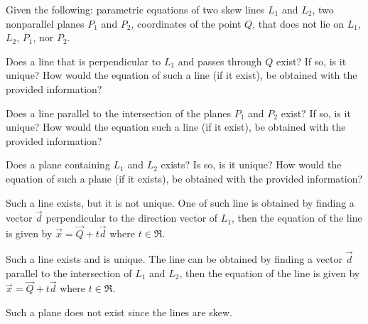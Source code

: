 
\begin{Exercise}[
name={},
title={}, 
difficulty=0,
origin={\cite{MB}}]
Given the following: parametric equations of two skew lines $L_1$ and $L_2$, two nonparallel planes $P_1$ and $P_2$, coordinates of the point $Q$, that does not lie on $L_1$, $L_2$, $P_1$, nor $P_2$. 

\Question Does a line that is perpendicular to $L_1$ and passes through $Q$ exist?
If so, is it unique? How would the equation of such a line (if it exist), be obtained with the provided information?

\Question Does a line parallel to the intersection of the planes $P_1$ and $P_2$ exist? If so, is it unique?
How would the equation such a line (if it exist), be obtained with the provided information?

\Question Does a plane containing $L_1$ and $L_2$ exists? Is so, is it unique? How would the equation of such a plane (if it exists), be obtained with the provided information?
\end{Exercise}

\begin{Answer}
\Question Such a line exists, but it is not unique.  One of such line is obtained by finding a vector $\vec{d}$ perpendicular to the direction vector of $L_1$, then the equation of the line is given by $\vec{x}=\vec{Q}+t\vec{d}$ where $t\in\Re$.

\Question Such a line exists and is unique.  The line can be obtained by finding a vector $\vec{d}$ parallel to the intersection of $L_1$ and $L_2$, then the equation of the line is given by $\vec{x}=\vec{Q}+t\vec{d}$ where $
t\in\Re$.

\Question Such a plane does not exist since the lines are skew.
\end{Answer}
